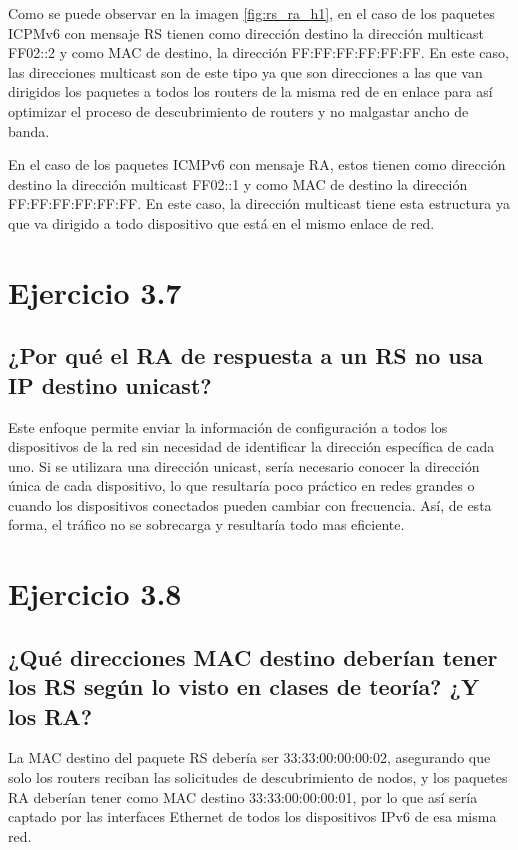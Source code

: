 Como se puede observar en la imagen \ref{fig:rs_ra_h1}, en el caso de los paquetes ICPMv6 con mensaje RS tienen como dirección destino la dirección multicast FF02::2 y como MAC de destino, la dirección FF:FF:FF:FF:FF:FF. En este caso, las direcciones multicast son de este tipo ya que son direcciones a las que van dirigidos los paquetes a todos los routers de la misma red de en enlace para así optimizar el proceso de descubrimiento de routers y no malgastar ancho de banda.

En el caso de los paquetes ICMPv6 con mensaje RA, estos tienen como dirección destino la dirección multicast FF02::1 y como MAC de destino la dirección FF:FF:FF:FF:FF:FF. En este caso, la dirección multicast tiene esta estructura ya que va dirigido a todo dispositivo que está en el mismo enlace de red. 

\section{Ejercicio 3.7}
\subsection{¿Por qué el RA de respuesta a un RS no usa IP destino unicast?}

Este enfoque permite enviar la información de configuración a todos los dispositivos de la red sin necesidad de identificar la dirección específica de cada uno. Si se utilizara una dirección unicast, sería necesario conocer la dirección única de cada dispositivo, lo que resultaría poco práctico en redes grandes o cuando los dispositivos conectados pueden cambiar con frecuencia. Así, de esta forma, el tráfico no se sobrecarga y resultaría todo mas eficiente.

\section{Ejercicio 3.8}
\subsection{¿Qué direcciones MAC destino deberían tener los RS según lo visto en clases de teoría? ¿Y los RA?}

La MAC destino del paquete RS debería ser 33:33:00:00:00:02, asegurando que solo los routers reciban las solicitudes de descubrimiento de nodos, y los paquetes RA deberían tener como MAC destino 33:33:00:00:00:01, por lo que así sería captado por las interfaces Ethernet de todos los dispositivos IPv6 de esa misma red.

